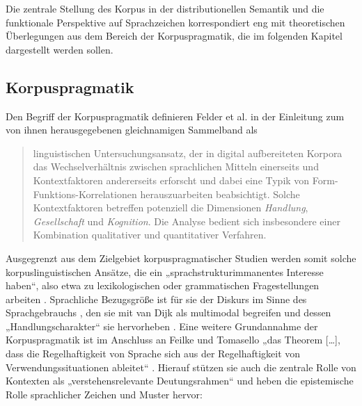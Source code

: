 Die zentrale Stellung des Korpus in der distributionellen Semantik und die funktionale Perspektive auf Sprachzeichen korrespondiert eng mit theoretischen Überlegungen aus dem Bereich der Korpuspragmatik, die im folgenden Kapitel dargestellt werden sollen.

\subsection{Korpuspragmatik}\label{korpuspragmatik}

Den Begriff der Korpuspragmatik definieren Felder et al. \autocite*{felderKorpuspragmatikParadigmaZwischen2012} in der Einleitung zum von ihnen herausgegebenen gleichnamigen Sammelband als

\begin{quote}
linguistischen Untersuchungsansatz, der in digital aufbereiteten Korpora das Wechselverhältnis zwischen sprachlichen Mitteln einerseits und Kontextfaktoren andererseits erforscht und dabei eine Typik von Form-Funktions-Korrelationen herauszuarbeiten beabsichtigt. Solche Kontextfaktoren betreffen potenziell die Dimensionen \emph{Handlung}, \emph{Gesellschaft} und \emph{Kognition}. Die Analyse bedient sich insbesondere einer Kombination qualitativer und quantitativer Verfahren. \autocite[4-5]{felderKorpuspragmatikParadigmaZwischen2012}
\end{quote}

Ausgegrenzt aus dem Zielgebiet korpuspragmatischer Studien werden somit solche korpuslinguistischen Ansätze, die ein „sprachstrukturimmanentes Interesse haben``, also etwa zu lexikologischen oder grammatischen Fragestellungen arbeiten \autocite[4]{felderKorpuspragmatikParadigmaZwischen2012}. Sprachliche Bezugsgröße ist für sie der Diskurs im Sinne des Sprachgebrauchs \autocite{fasoldSociolinguisticsLanguage1990}, den sie mit van Dijk \autocite*{vandijkDiscourseContextSociocognitive2008} als multimodal begreifen und dessen „Handlungscharakter`` sie hervorheben \autocite[5]{felderKorpuspragmatikParadigmaZwischen2012}. Eine weitere Grundannahme der Korpuspragmatik ist im Anschluss an Feilke \autocite*{feilkeSpracheAlsSoziale1996} und Tomasello \autocite*{tomaselloKonstruktionsgrammatikUndFrueher2006} „das Theorem {[}\ldots{]}, dass die Regelhaftigkeit von Sprache sich aus der Regelhaftigkeit von Verwendungssituationen ableitet`` \autocite[5]{felderKorpuspragmatikParadigmaZwischen2012}. Hierauf stützen sie auch die zentrale Rolle von Kontexten als „verstehensrelevante Deutungsrahmen`` \autocite[6]{felderKorpuspragmatikParadigmaZwischen2012} und heben die epistemische Rolle sprachlicher Zeichen und Muster hervor:

